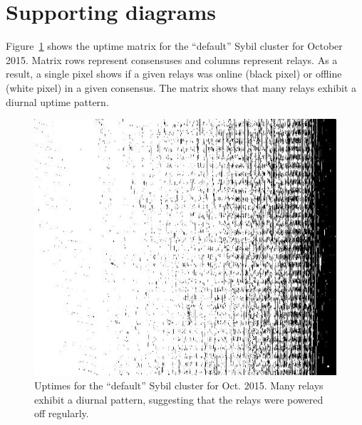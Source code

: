 \appendix

\section{Supporting diagrams}
Figure~\ref{fig:default-sybils-uptime} shows the uptime matrix for the
``default'' Sybil cluster for October 2015.  Matrix rows represent consensuses and
columns represent relays.  As a result, a single pixel shows if a given relays
was online (black pixel) or offline (white pixel) in a given consensus.  The
matrix shows that many relays exhibit a diurnal uptime pattern.

\begin{figure}[h]
	\centering
	\includegraphics[width=\linewidth]{diagrams/default-sybils-2015-10.jpg}
	\caption{Uptimes for the ``default'' Sybil cluster for Oct. 2015.  Many
	relays exhibit a diurnal pattern, suggesting that the relays were powered
	off regularly.}
	\label{fig:default-sybils-uptime}
\end{figure}
